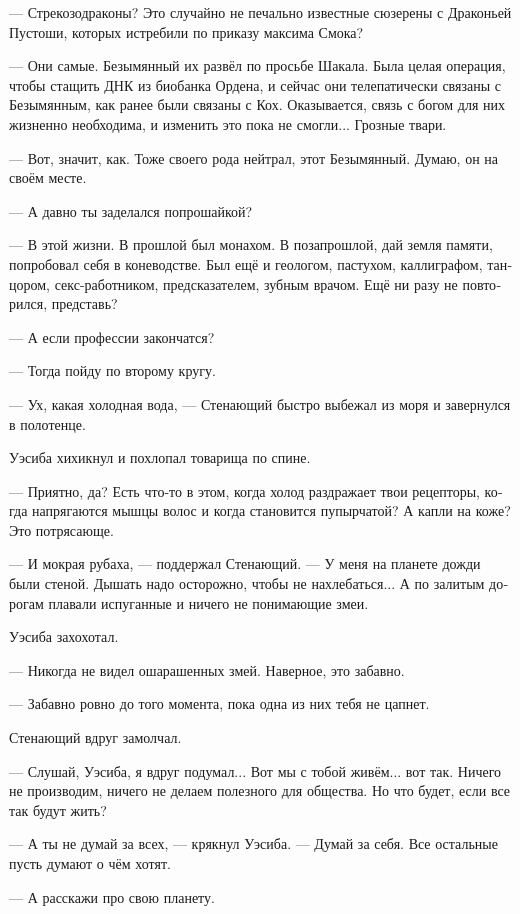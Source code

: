 \documentclass[a4paper,12pt,fleqn]{book}\usepackage{cooltooltips}\usepackage{polyglossia}\setdefaultlanguage[babelshorthands=true]{russian}\setotherlanguage{english}\defaultfontfeatures{Ligatures=TeX,Mapping=tex-text} \usepackage{xcolor}\definecolor{lightgray}{HTML}{bbbbbb}\color{lightgray}\newcommand{\ml}[3]{\textenglish{\textcolor{black}{#3}}}
\newcommand{\asterism}{\vspace{1em}{\centering\Large\bfseries$\ast~\ast~\ast$\par}\vspace{1em}}
\begin{document}
--- Стрекозодраконы?
Это случайно не печально известные сюзерены с Драконьей Пустоши, которых истребили по приказу максима Смока?

--- Они самые.
Безымянный их развёл по просьбе Шакала.
Была целая операция, чтобы стащить ДНК из биобанка Ордена, и сейчас они телепатически связаны с Безымянным, как ранее были связаны с Кох.
Оказывается, связь с богом для них жизненно необходима, и изменить это пока не смогли...
Грозные твари.

--- Вот, значит, как.
Тоже своего рода нейтрал, этот Безымянный.
Думаю, он на своём месте.

--- А давно ты заделался попрошайкой?

--- В этой жизни.
В прошлой был монахом.
В позапрошлой, дай земля памяти, попробовал себя в коневодстве.
Был ещё и геологом, пастухом, каллиграфом, танцором, секс-работником, предсказателем, зубным врачом.
Ещё ни разу не повторился, представь?

--- А если профессии закончатся?

--- Тогда пойду по второму кругу.

\asterism

--- Ух, какая холодная вода, --- Стенающий быстро выбежал из моря и завернулся в полотенце.

Уэсиба хихикнул и похлопал товарища по спине.

--- Приятно, да?
Есть что-то в этом, когда холод раздражает твои рецепторы, когда напрягаются мышцы волос и когда становится пупырчатой?
А капли на коже?
Это потрясающе.

--- И мокрая рубаха, --- поддержал Стенающий.
--- У меня на планете дожди были стеной.
Дышать надо осторожно, чтобы не нахлебаться...
А по залитым дорогам плавали испуганные и ничего не понимающие змеи.

Уэсиба захохотал.

--- Никогда не видел ошарашенных змей.
Наверное, это забавно.

--- Забавно ровно до того момента, пока одна из них тебя не цапнет.

Стенающий вдруг замолчал.

--- Слушай, Уэсиба, я вдруг подумал...
Вот мы с тобой живём... вот так.
Ничего не производим, ничего не делаем полезного для общества.
Но что будет, если все так будут жить?

--- А ты не думай за всех, --- крякнул Уэсиба.
--- Думай за себя.
Все остальные пусть думают о чём хотят.

--- А расскажи про свою планету.
\end{document}
